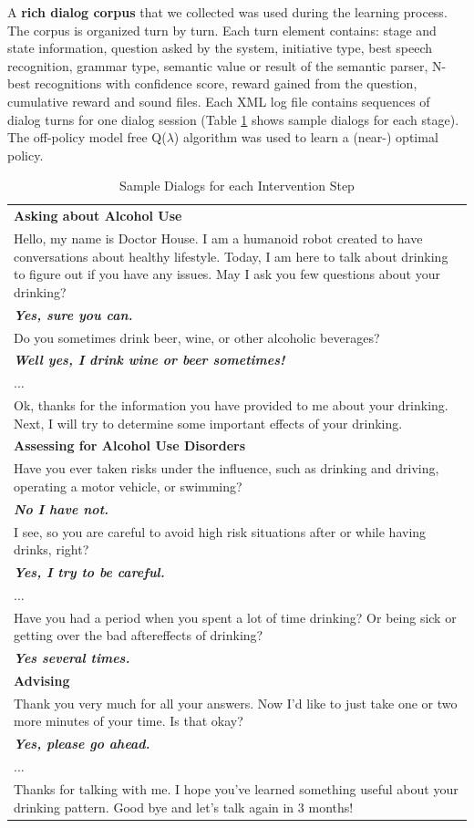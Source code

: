\documentclass[letterpaper]{article}
\begin{document}
\begin{sloppy}
A {\bf rich dialog corpus} that we collected was used during the learning process. The corpus is organized turn by 
turn. Each turn element contains: stage and state information, question asked by the system,  
initiative type,  best speech recognition, grammar type, semantic value or result of the semantic 
parser, N-best recognitions with confidence score, reward gained from the question, cumulative 
reward and sound files. Each XML log file contains sequences of dialog turns for one dialog 
session (Table \ref{sampleDialog} shows  sample dialogs for each stage). The off-policy model free 
Q($\lambda$) algorithm was used to learn a (near-) optimal policy.

\begin{table}[!h]
\caption{Sample Dialogs for each Intervention Step}
\label{sampleDialog}
\begin{tabular}{ p{80mm}  } \hline
    \textbf{Asking about Alcohol Use} \\
    Hello, my name is Doctor House. I am a humanoid robot created to have conversations about 
healthy lifestyle. Today, I am here to talk about drinking to figure out if you have any issues.  
May I ask you few questions about your drinking? \\
\bf{\em{Yes, sure you can.}}\\
Do you sometimes drink beer, wine, or other alcoholic beverages?\\
\bf{\em{Well yes, I drink wine or beer sometimes!}} \\
$\ldots$\\
Ok, thanks for the information you have provided to me about your drinking. Next, I will try to 
determine some important effects of your drinking. \\
    \hline
    \textbf{Assessing for Alcohol Use Disorders} \\
    Have you ever taken risks under the influence, such as drinking and driving, operating a motor 
vehicle, or swimming?\\
\bf{\em{No I have not.}} \\
I see, so you are careful to avoid high risk situations after or while having drinks, right?\\
\bf{\em{Yes, I try to be careful.}} \\
$\ldots$\\
Have you had a period when you spent a lot of time drinking? Or being sick or getting over the bad 
aftereffects of drinking? \\
\bf{\em{Yes several times.}} \\
    \hline
    \textbf{Advising} \\
     Thank you very much for all your answers. Now I'd like to just take one or two more minutes of 
your time. Is that okay? \\
\bf{\em{Yes, please go ahead.}}\\
$\ldots$\\
Thanks for talking with me. I hope you've learned something useful about your drinking pattern.  
Good bye and let's talk again in 3 months! \\
    \hline
\end{tabular}
\end{table}



\end{sloppy}
\end{document}
